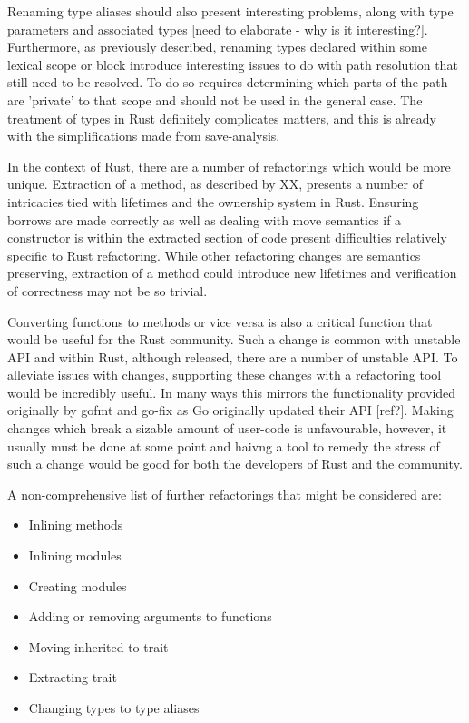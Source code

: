 Renaming type aliases should also present interesting problems, along with type parameters and associated types [need to elaborate - why is it interesting?]. Furthermore, as previously described, renaming types declared within some lexical scope or block introduce interesting issues to do with path resolution that still need to be resolved. To do so requires determining which parts of the path are 'private' to that scope and should not be used in the general case. The treatment of types in Rust definitely complicates matters, and this is already with the simplifications made from save-analysis.

In the context of Rust, there are a number of refactorings which would be more unique. Extraction of a method, as described by XX, presents a number of intricacies tied with lifetimes and the ownership system in Rust. Ensuring borrows are made correctly as well as dealing with move semantics if a constructor is within the extracted section of code present difficulties relatively specific to Rust refactoring. While other refactoring changes are semantics preserving, extraction of a method could introduce new lifetimes and verification of correctness may not be so trivial.

Converting functions to methods or vice versa is also a critical function that would be useful for the Rust community. Such a change is common with unstable API and within Rust, although released, there are a number of unstable API. To alleviate issues with changes, supporting these changes with a refactoring tool would be incredibly useful. In many ways this mirrors the functionality provided originally by gofmt and go-fix as Go originally updated their API [ref?]. Making changes which break a sizable amount of user-code is unfavourable, however, it usually must be done at some point and haivng a tool to remedy the stress of such a change would be good for both the developers of Rust and the community.

\noindent
A non-comprehensive list of further refactorings that might be considered are:
\begin{itemize}
\item Inlining methods
\item Inlining modules
\item Creating modules
\item Adding or removing arguments to functions
\item Moving inherited to trait
\item Extracting trait
\item Changing types to type aliases
\end{itemize}


